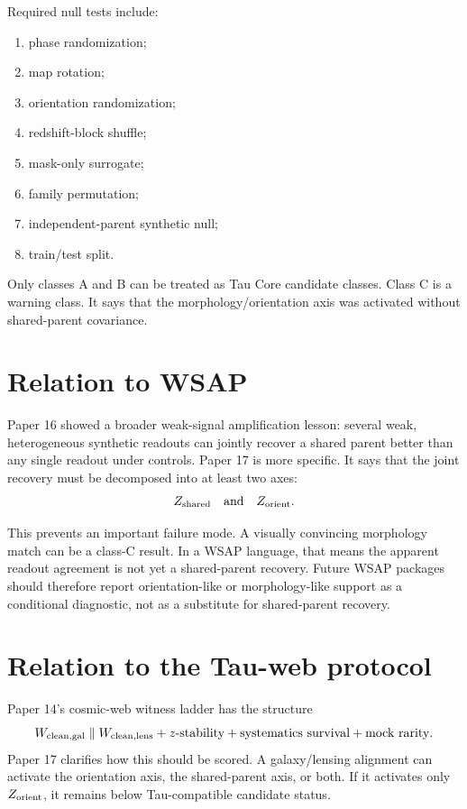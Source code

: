 \documentclass[12pt]{article}
\begin{document}
Required null tests include:
\begin{enumerate}[leftmargin=1.4em]
\item phase randomization;
\item map rotation;
\item orientation randomization;
\item redshift-block shuffle;
\item mask-only surrogate;
\item family permutation;
\item independent-parent synthetic null;
\item train/test split.
\end{enumerate}

Only classes A and B can be treated as Tau Core candidate classes.  Class C is
a warning class.  It says that the morphology/orientation axis was activated
without shared-parent covariance.

\section{Relation to WSAP}

Paper 16 showed a broader weak-signal amplification lesson: several weak,
heterogeneous synthetic readouts can jointly recover a shared parent better
than any single readout under controls.  Paper 17 is more specific.  It says
that the joint recovery must be decomposed into at least two axes:
\[
  Z_{\rm shared}
  \quad\text{and}\quad
  Z_{\rm orient}.
\]

This prevents an important failure mode.  A visually convincing morphology
match can be a class-C result.  In a WSAP language, that means the apparent
readout agreement is not yet a shared-parent recovery.  Future WSAP packages
should therefore report orientation-like or morphology-like support as a
conditional diagnostic, not as a substitute for shared-parent recovery.

\section{Relation to the Tau-web protocol}

Paper 14's cosmic-web witness ladder has the structure
\[
  W_{\rm clean,gal}
  \parallel
  W_{\rm clean,lens}
  +
  z\text{-stability}
  +
  \text{systematics survival}
  +
  \text{mock rarity}.
\]
Paper 17 clarifies how this should be scored.  A galaxy/lensing alignment can
activate the orientation axis, the shared-parent axis, or both.  If it activates
only \(Z_{\rm orient}\), it remains below Tau-compatible candidate status.
\end{document}
